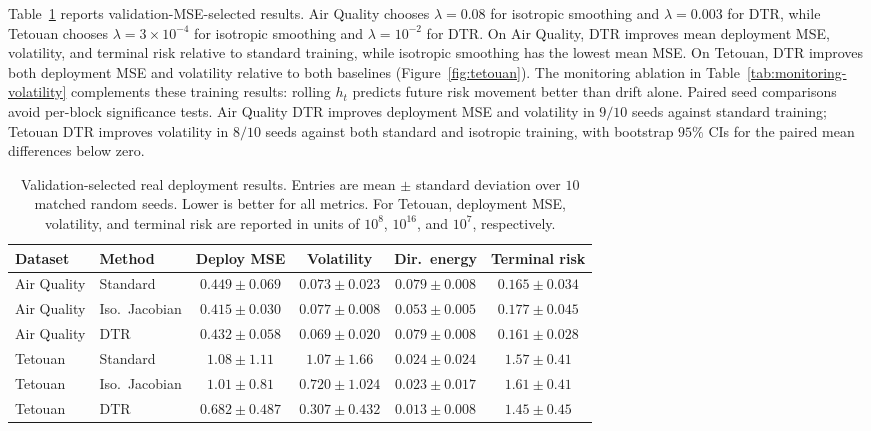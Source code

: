 \documentclass[conference]{IEEEtran}
\begin{document}
Table~\ref{tab:real-results} reports validation-MSE-selected results. Air Quality chooses $\lambda=0.08$ for isotropic smoothing and $\lambda=0.003$ for DTR, while Tetouan chooses $\lambda=3\times10^{-4}$ for isotropic smoothing and $\lambda=10^{-2}$ for DTR. On Air Quality, DTR improves mean deployment MSE, volatility, and terminal risk relative to standard training, while isotropic smoothing has the lowest mean MSE. On Tetouan, DTR improves both deployment MSE and volatility relative to both baselines (Figure~\ref{fig:tetouan}). The monitoring ablation in Table~\ref{tab:monitoring-volatility} complements these training results: rolling $h_t$ predicts future risk movement better than drift alone. Paired seed comparisons avoid per-block significance tests. Air Quality DTR improves deployment MSE and volatility in $9/10$ seeds against standard training; Tetouan DTR improves volatility in $8/10$ seeds against both standard and isotropic training, with bootstrap $95\%$ CIs for the paired mean differences below zero.

\begin{table}[t]
\caption{Validation-selected real deployment results. Entries are mean $\pm$ standard deviation over $10$ matched random seeds. Lower is better for all metrics. For Tetouan, deployment MSE, volatility, and terminal risk are reported in units of $10^8$, $10^{16}$, and $10^7$, respectively.}
\centering
\setlength{\tabcolsep}{4pt}
\footnotesize
\begin{tabular}{llcccc}
\toprule
Dataset & Method & Deploy MSE & Volatility & Dir.\ energy & Terminal risk \\
\midrule
Air Quality & Standard & $0.449\pm0.069$ & $0.073\pm0.023$ & $0.079\pm0.008$ & $0.165\pm0.034$ \\
Air Quality & Iso.\ Jacobian & $0.415\pm0.030$ & $0.077\pm0.008$ & $0.053\pm0.005$ & $0.177\pm0.045$ \\
Air Quality & DTR & $0.432\pm0.058$ & $0.069\pm0.020$ & $0.079\pm0.008$ & $0.161\pm0.028$ \\
\addlinespace
Tetouan & Standard & $1.08\pm1.11$ & $1.07\pm1.66$ & $0.024\pm0.024$ & $1.57\pm0.41$ \\
Tetouan & Iso.\ Jacobian & $1.01\pm0.81$ & $0.720\pm1.024$ & $0.023\pm0.017$ & $1.61\pm0.41$ \\
Tetouan & DTR & $0.682\pm0.487$ & $0.307\pm0.432$ & $0.013\pm0.008$ & $1.45\pm0.45$ \\
\bottomrule
\end{tabular}
\label{tab:real-results}
\end{table}
\end{document}
